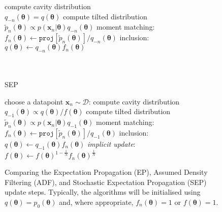 \begin{figure}[!t]
\begin{minipage}[t]{0.33\linewidth}
\begin{algorithm}[H]
\begin{algorithmic}[1]
	\STATE compute cavity distribution \\$q_{-n}(\bm{\theta}) = q(\bm{\theta})$
	\STATE compute tilted distribution \\$\tilde{p}_n(\bm{\theta}) \propto p(\bm{x}_n|\bm{\theta}) q_{-n}(\bm{\theta})$
	\STATE moment matching: \\ \hspace{-1mm}$f_n(\bm{\theta}) \leftarrow \mathtt{proj}[\tilde{p}_n(\bm{\theta})] / q_{-n}(\bm{\theta}) $
	\STATE inclusion:\\ $q(\bm{\theta}) \leftarrow q_{-n}(\bm{\theta}) f_n(\bm{\theta})$\\\hspace{1mm}\\ \vspace{1.5mm} \hspace{1mm}\\
\end{algorithmic}
\end{algorithm}
\end{minipage}
\begin{minipage}[t]{0.33\linewidth}
\centering
\begin{algorithm}[H]
\caption{SEP} \small
\label{alg:sep} 
\begin{algorithmic}[1] 
	\STATE choose a datapoint $\bm{x}_n\sim \mathcal{D}$:
	\STATE compute cavity distribution \\ $q_{-1}(\bm{\theta}) \propto q(\bm{\theta}) / f(\bm{\theta})$
	\STATE compute tilted distribution \\$\tilde{p}_n(\bm{\theta}) \propto p(\bm{x}_n|\bm{\theta}) q_{-1}(\bm{\theta})$
	\STATE moment matching: \\\hspace{-1mm}$f_n(\bm{\theta}) \leftarrow \mathtt{proj}[\tilde{p}_n(\bm{\theta})] / q_{-1}(\bm{\theta}) $
	\STATE inclusion:\\ $q(\bm{\theta}) \leftarrow q_{-1}(\bm{\theta}) f_n(\bm{\theta})$
	\STATE \textit{implicit update}:\\ $f(\bm{\theta}) \leftarrow f(\bm{\theta})^{1 - \frac{1}{N}} f_n(\bm{\theta})^{\frac{1}{N}}$
\end{algorithmic}
\end{algorithm}
\end{minipage} 
%
\caption{Comparing the Expectation Propagation (EP), Assumed Density Filtering (ADF), and Stochastic Expectation Propagation (SEP) update steps. Typically, the algorithms will be initialised using $q(\bm{\theta}) = p_0(\bm{\theta})$ and, where appropriate, $f_n(\bm{\theta})=1$ or $f(\bm{\theta})=1$.}
\end{figure}

